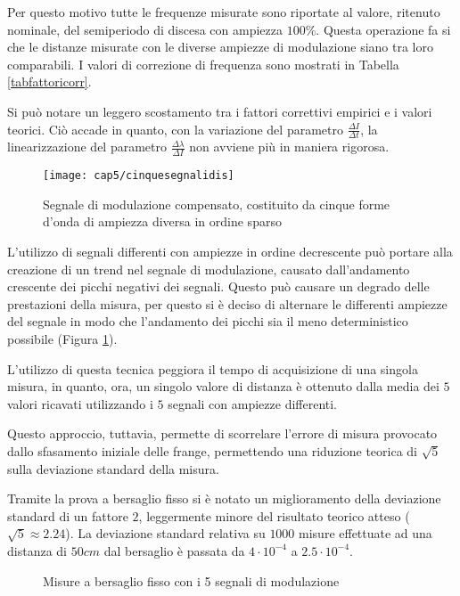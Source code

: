 Per questo motivo tutte le frequenze misurate sono riportate al valore, ritenuto nominale, del semiperiodo di discesa con ampiezza $100\%$. Questa operazione fa si che le distanze misurate con le diverse ampiezze di modulazione siano tra loro comparabili. I valori di correzione di frequenza sono mostrati in Tabella \ref{tabfattoricorr}.

Si può notare un leggero scostamento tra i fattori correttivi empirici e i valori teorici. Ciò accade in quanto, con la variazione del parametro $\frac{\Delta I}{\Delta t}$, la linearizzazione del parametro $\frac{\Delta \lambda}{\Delta I}$ non avviene più in maniera rigorosa.
\begin{figure}  
  \begin{center}
    \texttt{[image: cap5/cinquesegnalidis]}
    \caption{Segnale di modulazione compensato, costituito da cinque forme d'onda di ampiezza diversa in ordine sparso}
    \label{cinquesegnalidis}
  \end{center}
\end{figure}

L'utilizzo di segnali differenti con ampiezze in ordine decrescente può portare alla creazione di un trend nel segnale di modulazione, causato dall'andamento crescente dei picchi negativi dei segnali. Questo può causare un degrado delle prestazioni della misura, per questo si è deciso di alternare le differenti ampiezze del segnale in modo che l'andamento dei picchi sia il meno deterministico possibile (Figura \ref{cinquesegnalidis}).

L'utilizzo di questa tecnica peggiora il tempo di acquisizione di una singola misura, in quanto, ora, un singolo valore di distanza è ottenuto dalla media dei $5$ valori ricavati utilizzando i $5$ segnali con ampiezze differenti.

Questo approccio, tuttavia, permette di scorrelare l'errore di misura provocato dallo sfasamento iniziale delle frange, permettendo una riduzione teorica di $\sqrt{5}$ sulla deviazione standard della misura. 

Tramite la prova a bersaglio fisso si è notato un miglioramento della deviazione standard di un fattore $2$, leggermente minore del risultato teorico atteso ($\sqrt{5} \approx 2.24$). La deviazione standard relativa su $1000$ misure effettuate ad una distanza di $50 cm$ dal bersaglio è passata da $4 \cdot 10^{-4}$ a $2.5 \cdot 10^{-4}$. 

\begin{figure}
\centering
{}
\hspace{5mm}
\caption{Misure a bersaglio fisso con i 5 segnali di modulazione}\label{misfisso4}
\end{figure}

